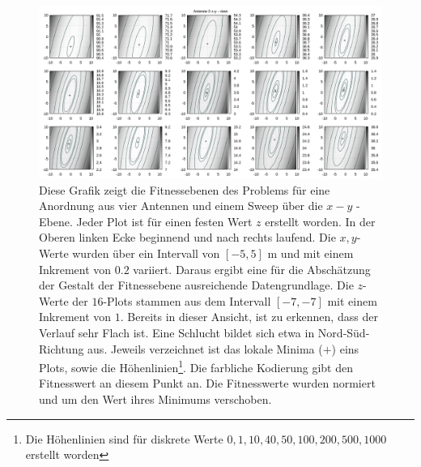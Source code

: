 %
\begin{figure}[h!]
  \caption[Fitness Ebenen Heatmap]{Diese Grafik zeigt die Fitnessebenen des Problems für eine Anordnung aus vier Antennen und einem Sweep über die $x-y$ - Ebene. Jeder Plot ist für einen festen Wert $z$ erstellt worden. In der Oberen linken Ecke beginnend und nach rechts laufend. Die $x, y$-Werte wurden über ein Intervall von $[-5,5]$ m und mit einem Inkrement von $0.2$ variiert. Daraus ergibt eine für die Abschätzung der Gestalt der Fitnessebene ausreichende Datengrundlage. Die $z$-Werte der $16$-Plots stammen aus dem Intervall $[-7,-7]$ mit einem Inkrement von $1$. Bereits in dieser Ansicht, ist zu erkennen, dass der Verlauf sehr Flach ist. Eine Schlucht bildet sich etwa in Nord-Süd-Richtung aus. Jeweils verzeichnet ist das lokale Minima ($+$) eins Plots, sowie die Höhenlinien\footnote{Die Höhenlinien sind für diskrete Werte ${0,1,10,40,50,100,200,500,1000}$ erstellt worden}. Die farbliche Kodierung gibt den Fitnesswert an diesem Punkt an. Die Fitnesswerte wurden normiert und um den Wert ihres Minimums verschoben.}
  \begin{center}
    \includegraphics[width=\textwidth]{img/fitness/xy_a0.png}
  \end{center}
  \label{fig:fitnessplane1-x-y-1}
%
\end{figure}

